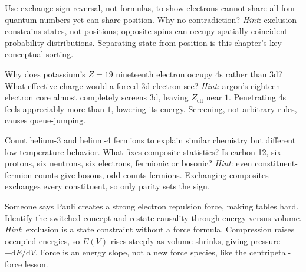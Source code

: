 \begin{puzzles}
\item Use exchange sign reversal, not formulas, to show electrons cannot share all four quantum numbers yet can share position. Why no contradiction? \emph{Hint}: exclusion constrains states, not positions; opposite spins can occupy spatially coincident probability distributions. Separating state from position is this chapter's key conceptual sorting.
\item Why does potassium's \(Z=19\) nineteenth electron occupy 4s rather than 3d? What effective charge would a forced 3d electron see? \emph{Hint}: argon's eighteen-electron core almost completely screens 3d, leaving \(Z_{\mathrm{eff}}\) near \(1\). Penetrating 4s feels appreciably more than \(1\), lowering its energy. Screening, not arbitrary rules, causes queue-jumping.
\item Count helium-3 and helium-4 fermions to explain similar chemistry but different low-temperature behavior. What fixes composite statistics? Is carbon-12, six protons, six neutrons, six electrons, fermionic or bosonic? \emph{Hint}: even constituent-fermion counts give bosons, odd counts fermions. Exchanging composites exchanges every constituent, so only parity sets the sign.
\item Someone says Pauli creates a strong electron repulsion force, making tables hard. Identify the switched concept and restate causality through energy versus volume. \emph{Hint}: exclusion is a state constraint without a force formula. Compression raises occupied energies, so \(E(V)\) rises steeply as volume shrinks, giving pressure \(-\mathrm dE/\mathrm dV\). Force is an energy slope, not a new force species, like the centripetal-force lesson.
\end{puzzles}
